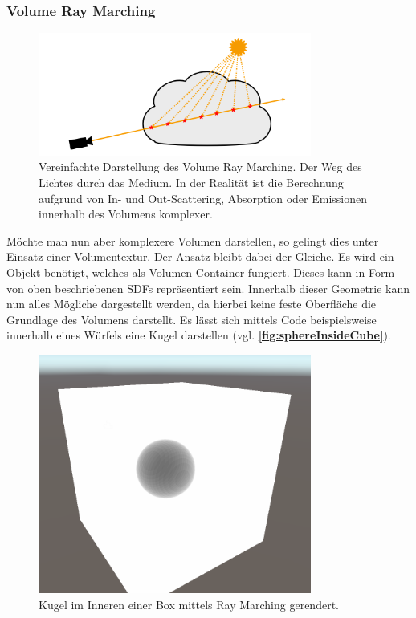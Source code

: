 



\subsubsection{Volume Ray Marching}

\begin{figure}[!h]
	\centering
	\includegraphics[width=0.80\textwidth]{Grafiken/Basics/Volume/Volume_RayMarching.png}
	\begin{footnotesize}
		\caption{Vereinfachte Darstellung des Volume Ray Marching. Der Weg des Lichtes durch
			das Medium. In der Realität ist die Berechnung aufgrund von In- und Out-Scattering, Absorption oder Emissionen innerhalb des
			Volumens komplexer.}
		\label{fig:volumeRayMarching}
	\end{footnotesize}
\end{figure}


Möchte man nun aber komplexere Volumen darstellen, so gelingt dies unter Einsatz einer Volumentextur. Der Ansatz bleibt dabei der Gleiche.
Es wird ein Objekt benötigt, welches als Volumen Container fungiert. Dieses kann in Form von oben beschriebenen SDFs repräsentiert sein.
Innerhalb dieser Geometrie kann nun alles Mögliche dargestellt werden, da hierbei keine feste Oberfläche die Grundlage des
Volumens darstellt. Es lässt sich mittels Code beispielsweise innerhalb eines Würfels eine Kugel darstellen (vgl. \textbf{\autoref{fig:sphereInsideCube}}).

\begin{figure}[!h]
	\centering
	\includegraphics[width=0.80\textwidth]{Grafiken/Implementation/Raymarch/sphereInsideCube.png}
	\begin{footnotesize}
		\caption{Kugel im Inneren einer Box mittels Ray Marching gerendert.}
		\label{fig:sphereInsideCube}
	\end{footnotesize}
\end{figure}


